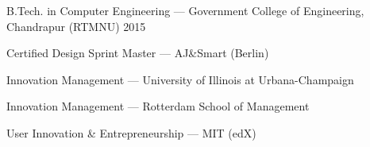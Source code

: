\documentclass[11pt, a4paper]{awesome-cv}
\begin{document}

\begin{cventries}
  \cventry
    {}
    {B.Tech. in Computer Engineering — Government College of Engineering, Chandrapur (RTMNU)}
    {2015}
    {}
    {}
\end{cventries}

\vspace{0.3em}
\begin{cvitems}
  \item {Certified Design Sprint Master — AJ\&Smart (Berlin)}
  \item {Innovation Management — University of Illinois at Urbana-Champaign}
  \item {Innovation Management — Rotterdam School of Management}
  \item {User Innovation \& Entrepreneurship — MIT (edX)}
\end{cvitems}
\end{document}
